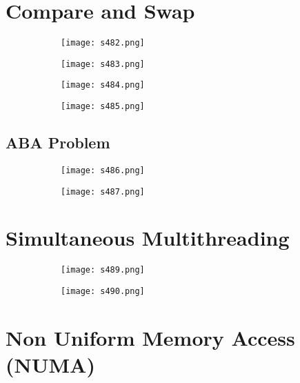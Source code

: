 \documentclass[8pt]{extreport}
\begin{document}
\section{Compare and Swap}
 \begin{figure}[H]
\begin{subfigure}[b]{0.4\linewidth}
\texttt{[image: s482.png]}
\end{subfigure}
\begin{subfigure}[b]{0.4\linewidth}
\texttt{[image: s483.png]}
\end{subfigure}
\begin{subfigure}[b]{0.4\linewidth}
\texttt{[image: s484.png]}
\end{subfigure}
\begin{subfigure}[b]{0.4\linewidth}
\texttt{[image: s485.png]}
\end{subfigure}
\end{figure}
\subsection{ABA Problem}
 \begin{figure}[H]
\begin{subfigure}[b]{0.4\linewidth}
\texttt{[image: s486.png]}
\end{subfigure}
\begin{subfigure}[b]{0.4\linewidth}
\texttt{[image: s487.png]}
\end{subfigure}
\end{figure}


\section{Simultaneous Multithreading}
 \begin{figure}[H]
\begin{subfigure}[b]{0.4\linewidth}
\texttt{[image: s489.png]}
\end{subfigure}
\begin{subfigure}[b]{0.4\linewidth}
\texttt{[image: s490.png]}
\end{subfigure}
\end{figure}


\section{Non Uniform Memory Access (NUMA)}
\end{document}
